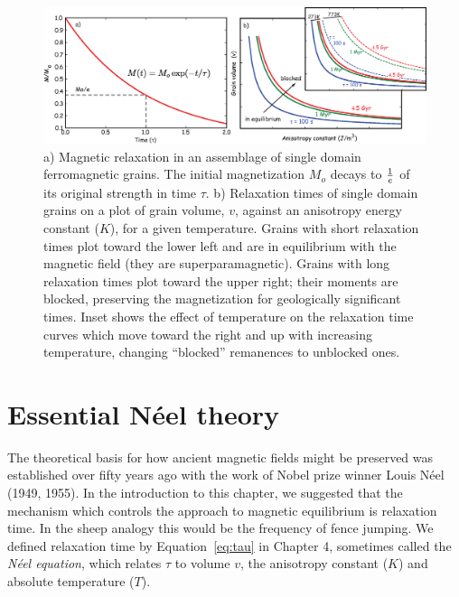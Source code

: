 \begin{figure}[h!tb]
\centering  \includegraphics[width=14 cm]{EPSfiles/neel.eps}
\caption{ a) Magnetic relaxation in an assemblage of single domain ferromagnetic grains.  The initial magnetization  $M_o$ decays to $1\over e$ of its original strength in time $\tau$. b) Relaxation times of single domain grains on a plot of  grain
volume, $v$, against an anisotropy energy constant ($K$), for a  given temperature.  Grains with short relaxation times plot toward the lower left and are in equilibrium with the magnetic field (they are superparamagnetic). Grains with long relaxation times plot toward the upper right;  their moments are blocked, preserving the magnetization for geologically significant times.  Inset shows the effect of temperature on the relaxation time curves which move toward the right and up with increasing temperature, changing ``blocked'' remanences to unblocked ones.  }
\label{fig:neel}
\end{figure}
 


\section {Essential  N\'eel theory}


The theoretical basis for how ancient magnetic fields might be preserved was established over fifty years ago with the  work of Nobel prize winner  
Louis N\'eel (1949, 1955). \nocite{neel49} \nocite{neel55}
In the introduction to this chapter, we suggested that the  mechanism which controls the approach to magnetic
 equilibrium is   relaxation time.  In the sheep analogy this would be  the frequency of fence jumping. We defined relaxation time  by Equation~\ref{eq:tau} in  Chapter 4, sometimes called  the 
  {\it N\'eel equation},  which  relates  $\tau$ to volume $v$, the anisotropy constant ($K$) and  absolute temperature ($T$). 
     
